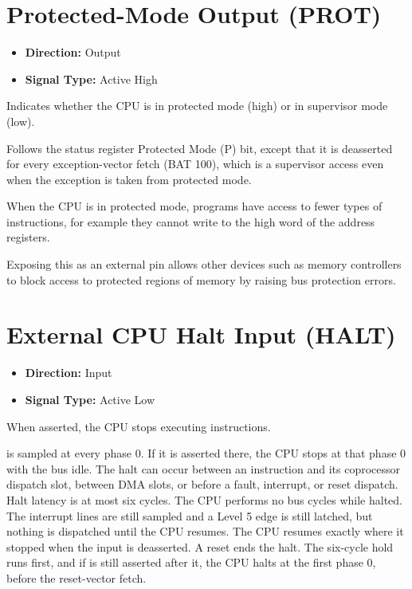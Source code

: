 \section{Protected-Mode Output (PROT)}

\begin{itemize}
	\item \textbf{Direction:} Output
	\item \textbf{Signal Type:} Active High
\end{itemize}

Indicates whether the CPU is in protected mode (high) or in supervisor mode (low).

Follows the status register Protected Mode (P) bit, except that it is deasserted for every exception-vector fetch (BAT
100), which is a supervisor access even when the exception is taken from protected mode.

When the CPU is in protected mode, programs have access to fewer types of instructions, for example they cannot write
to the high word of the address registers.

Exposing this as an external pin allows other devices such as memory controllers to block access to protected regions
of memory by raising bus protection errors.

\section{External CPU Halt Input (HALT)}

\begin{itemize}
	\item \textbf{Direction:} Input
	\item \textbf{Signal Type:} Active Low
\end{itemize}

When asserted, the CPU stops executing instructions.

 is sampled at every phase 0. If it is asserted there, the CPU stops at that phase 0 with the bus idle. The halt
can occur between an instruction and its coprocessor dispatch slot, between DMA slots, or before a fault, interrupt, or
reset dispatch. Halt latency is at most six cycles. The CPU performs no bus cycles while halted. The interrupt lines
are still sampled and a Level 5 edge is still latched, but nothing is dispatched until the CPU resumes. The CPU resumes
exactly where it stopped when the input is deasserted. A reset ends the halt. The six-cycle  hold runs first, and if  is
still asserted after it, the CPU halts at the first phase 0, before the reset-vector fetch.

